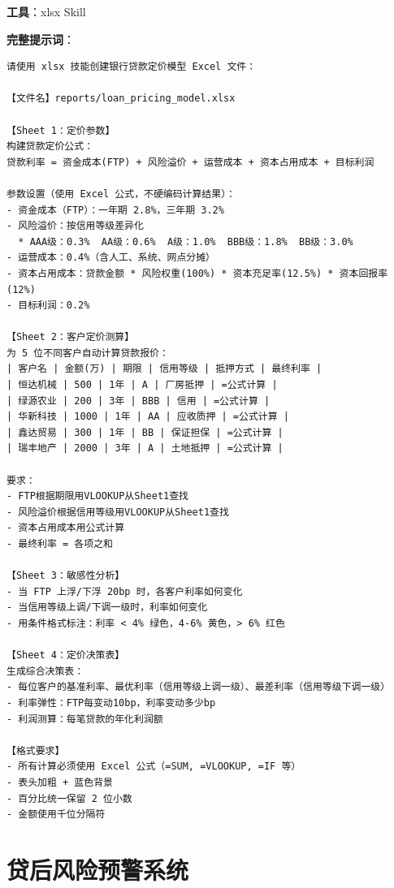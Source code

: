 \begin{practicebox}[实操：银行贷款FTP定价模型]
\textbf{工具}：xlsx Skill

\textbf{完整提示词}：

\begin{lstlisting}
请使用 xlsx 技能创建银行贷款定价模型 Excel 文件：

【文件名】reports/loan_pricing_model.xlsx

【Sheet 1：定价参数】
构建贷款定价公式：
贷款利率 = 资金成本(FTP) + 风险溢价 + 运营成本 + 资本占用成本 + 目标利润

参数设置（使用 Excel 公式，不硬编码计算结果）：
- 资金成本（FTP）：一年期 2.8%，三年期 3.2%
- 风险溢价：按信用等级差异化
  * AAA级：0.3%  AA级：0.6%  A级：1.0%  BBB级：1.8%  BB级：3.0%
- 运营成本：0.4%（含人工、系统、网点分摊）
- 资本占用成本：贷款金额 * 风险权重(100%) * 资本充足率(12.5%) * 资本回报率(12%)
- 目标利润：0.2%

【Sheet 2：客户定价测算】
为 5 位不同客户自动计算贷款报价：
| 客户名 | 金额(万) | 期限 | 信用等级 | 抵押方式 | 最终利率 |
| 恒达机械 | 500 | 1年 | A | 厂房抵押 | =公式计算 |
| 绿源农业 | 200 | 3年 | BBB | 信用 | =公式计算 |
| 华新科技 | 1000 | 1年 | AA | 应收质押 | =公式计算 |
| 鑫达贸易 | 300 | 1年 | BB | 保证担保 | =公式计算 |
| 瑞丰地产 | 2000 | 3年 | A | 土地抵押 | =公式计算 |

要求：
- FTP根据期限用VLOOKUP从Sheet1查找
- 风险溢价根据信用等级用VLOOKUP从Sheet1查找
- 资本占用成本用公式计算
- 最终利率 = 各项之和

【Sheet 3：敏感性分析】
- 当 FTP 上浮/下浮 20bp 时，各客户利率如何变化
- 当信用等级上调/下调一级时，利率如何变化
- 用条件格式标注：利率 < 4% 绿色，4-6% 黄色，> 6% 红色

【Sheet 4：定价决策表】
生成综合决策表：
- 每位客户的基准利率、最优利率（信用等级上调一级）、最差利率（信用等级下调一级）
- 利率弹性：FTP每变动10bp，利率变动多少bp
- 利润测算：每笔贷款的年化利润额

【格式要求】
- 所有计算必须使用 Excel 公式（=SUM, =VLOOKUP, =IF 等）
- 表头加粗 + 蓝色背景
- 百分比统一保留 2 位小数
- 金额使用千位分隔符
\end{lstlisting}
\end{practicebox}

\section{贷后风险预警系统}

